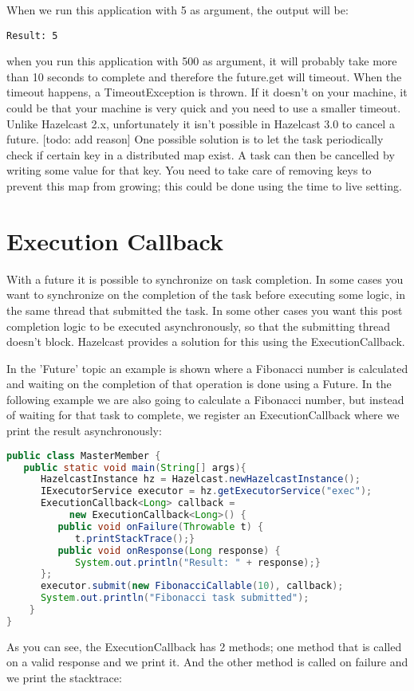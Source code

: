 When we run this application with 5 as argument, the output will be: 
\begin{lstlisting}
Result: 5
\end{lstlisting}
when you run this application with 500 as argument, it will probably take more than 10 seconds to complete and therefore the future.get will timeout. When the timeout happens, a TimeoutException is thrown. If it doesn't on your machine, it could be that your machine is very quick and you need to use a smaller timeout. Unlike Hazelcast 2.x, unfortunately it isn't possible in Hazelcast 3.0 to cancel a future. [todo: add reason] One possible solution is to let the task periodically check if certain key in a distributed map exist. A task can then be cancelled by writing some value for that key. You need to take care of removing keys to prevent this map from growing; this could be done using the time to live setting.

\section{Execution Callback}
With a future it is possible to synchronize on task completion. In some cases you want to synchronize on the completion of the task before executing some logic, in the same thread that submitted the task. In some other cases you want this post completion logic to be executed asynchronously, so that the submitting thread doesn't block. Hazelcast provides a solution for this using the ExecutionCallback.

In the 'Future' topic an example is shown where a Fibonacci number is calculated and waiting on the completion of that operation is done using a Future. In the following example we are also going to calculate a Fibonacci number, but instead of waiting for that task to complete, we register an ExecutionCallback where we print the result asynchronously:
\begin{lstlisting}[language=java]
public class MasterMember {
   public static void main(String[] args){
      HazelcastInstance hz = Hazelcast.newHazelcastInstance();
      IExecutorService executor = hz.getExecutorService("exec");
      ExecutionCallback<Long> callback = 
           new ExecutionCallback<Long>() {
         public void onFailure(Throwable t) {
            t.printStackTrace();}
         public void onResponse(Long response) {
            System.out.println("Result: " + response);}
      };
      executor.submit(new FibonacciCallable(10), callback);
      System.out.println("Fibonacci task submitted");
    }
}
\end{lstlisting}
As you can see, the ExecutionCallback has 2 methods; one method that is called on a valid response and we print it. And the other method is called on failure and we print the stacktrace: 

